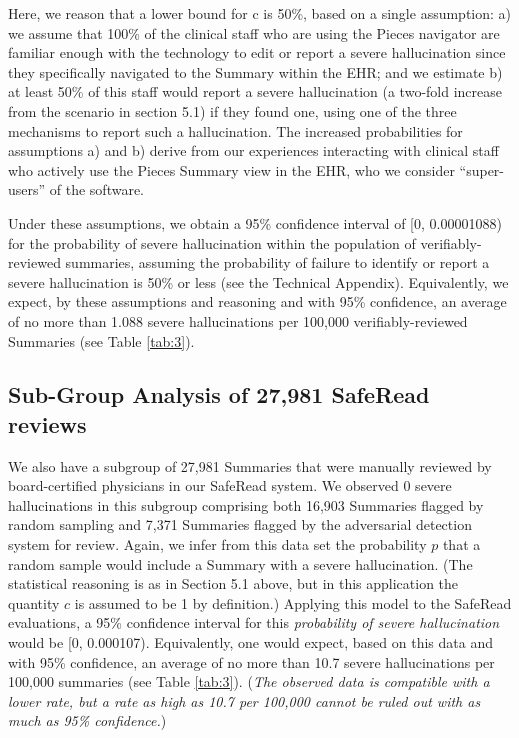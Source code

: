 \documentclass{style/myclass}
\begin{document}
Here, we reason that a lower bound for c is 50\%, based on a single assumption: a) we assume that 100\% of the clinical staff who are using the Pieces navigator are familiar enough with the technology to edit or report a severe hallucination since they specifically navigated to the Summary within the EHR; and we estimate b) at least 50\% of this staff would report a severe hallucination (a two-fold increase from the scenario in section 5.1) if they found one, using one of the three mechanisms to report such a hallucination. \cite{20} The increased probabilities for assumptions a) and b) derive from our experiences interacting with clinical staff who actively use the Pieces Summary view in the EHR, who we consider “super-users” of the software. \cite{21}

Under these assumptions, we obtain a 95\% confidence interval of [0, 0.00001088) for the probability of severe hallucination within the population of verifiably-reviewed summaries, assuming the probability of failure to identify or report a severe hallucination is 50\% or less (see the Technical Appendix). Equivalently, we expect, by these assumptions and reasoning and with 95\% confidence, an average of no more than 1.088 severe hallucinations per 100,000 verifiably-reviewed Summaries (see Table \ref{tab:3}).

\subsection{Sub-Group Analysis of 27,981 SafeRead reviews}

We also have a subgroup of 27,981 Summaries that were manually reviewed by board-certified physicians in our SafeRead system. We observed 0 severe hallucinations in this subgroup comprising both 16,903 Summaries flagged by random sampling and 7,371 Summaries flagged by the adversarial detection system for review. Again, we infer from this data set the probability $p$ that a random sample would include a Summary with a severe hallucination. (The statistical reasoning is as in Section 5.1 above, but in this application the quantity $c$ is assumed to be 1 by definition.) Applying this model to the SafeRead evaluations, a 95\% confidence interval for this \textit{probability of severe hallucination} would be [0, 0.000107). Equivalently, one would expect, based on this data and with 95\% confidence, an average of no more than 10.7 severe hallucinations per 100,000 summaries (see Table \ref{tab:3}). (\textit{The observed data is compatible with a lower rate, but a rate as high as 10.7 per 100,000 cannot be ruled out with as much as 95\% confidence.})
\end{document}

